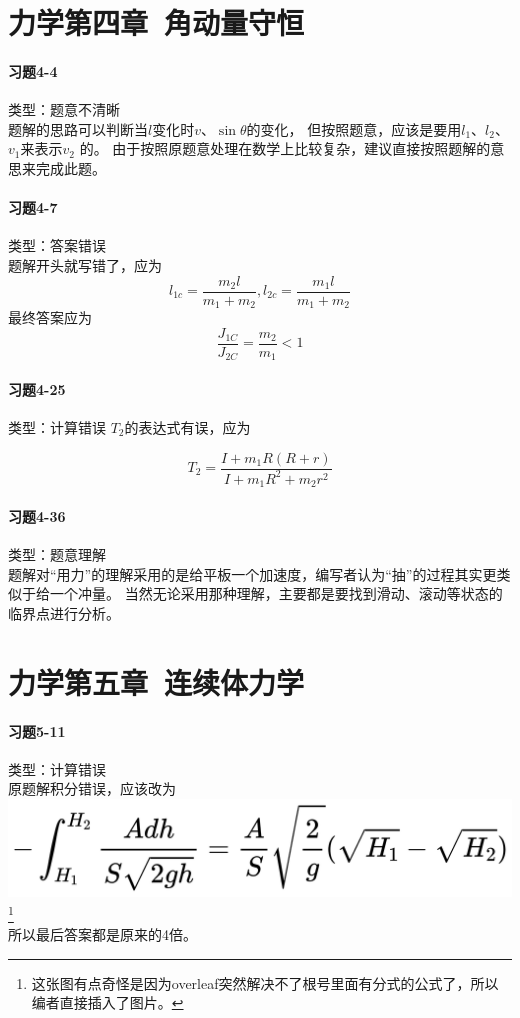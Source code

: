 \documentclass[a4paper,11pt]{ctexart}
\begin{document}
\section{力学第四章\ 角动量守恒}
\paragraph{习题4-4}类型：题意不清晰\\
题解的思路可以判断当$l$变化时$v$、$\sin{\theta}$的变化，
但按照题意，应该是要用$l_1$、$l_2$、$v_1$来表示$v_2$ 的。
由于按照原题意处理在数学上比较复杂，建议直接按照题解的意思来完成此题。

\paragraph{习题4-7}类型：答案错误\\
题解开头就写错了，应为
\begin{equation*}
    l_{1c}=\frac{m_2l}{m_1+m_2},l_{2c}=\frac{m_1l}{m_1+m_2}
\end{equation*}
最终答案应为
\begin{equation*}
    \frac{J_{1C}}{J_{2C}} =\frac{m_2}{m_1}<1
\end{equation*}

\paragraph{习题4-25}类型：计算错误
$T_2$的表达式有误，应为

\begin{equation*}
    T_2=\frac{I+m_1R(R+r)}{I+m_1R^2+m_2r^2}
\end{equation*}


\paragraph{习题4-36}类型：题意理解\\
题解对“用力”的理解采用的是给平板一个加速度，编写者认为“抽”的过程其实更类似于给一个冲量。
当然无论采用那种理解，主要都是要找到滑动、滚动等状态的临界点进行分析。

\section{力学第五章\ 连续体力学}
\paragraph{习题5-11}类型：计算错误\\
原题解积分错误，应该改为\\
\includegraphics[scale = 0.045]{1.jpg}
\footnote{这张图有点奇怪是因为overleaf突然解决不了根号里面有分式的公式了，所以编者直接插入了图片。}\\
所以最后答案都是原来的4倍。
\end{document}
